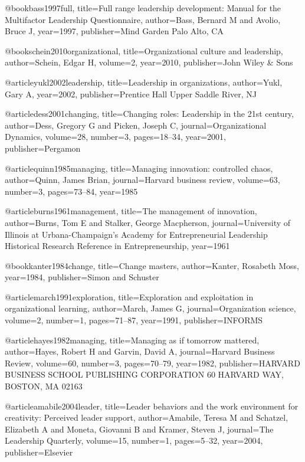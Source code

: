 @book{bass1997full,
  title={Full range leadership development: Manual for the Multifactor Leadership Questionnaire},
  author={Bass, Bernard M and Avolio, Bruce J},
  year={1997},
  publisher={Mind Garden Palo Alto, CA}
}

@book{schein2010organizational,
  title={Organizational culture and leadership},
  author={Schein, Edgar H},
  volume={2},
  year={2010},
  publisher={John Wiley \& Sons}
}

@article{yukl2002leadership,
  title={Leadership in organizations},
  author={Yukl, Gary A},
  year={2002},
  publisher={Prentice Hall Upper Saddle River, NJ}
}

@article{dess2001changing,
  title={Changing roles: Leadership in the 21st century},
  author={Dess, Gregory G and Picken, Joseph C},
  journal={Organizational Dynamics},
  volume={28},
  number={3},
  pages={18--34},
  year={2001},
  publisher={Pergamon}
}

@article{quinn1985managing,
  title={Managing innovation: controlled chaos},
  author={Quinn, James Brian},
  journal={Harvard business review},
  volume={63},
  number={3},
  pages={73--84},
  year={1985}
}

@article{burns1961management,
  title={The management of innovation},
  author={Burns, Tom E and Stalker, George Macpherson},
  journal={University of Illinois at Urbana-Champaign's Academy for Entrepreneurial Leadership Historical Research Reference in Entrepreneurship},
  year={1961}
}

@book{kanter1984change,
  title={Change masters},
  author={Kanter, Rosabeth Moss},
  year={1984},
  publisher={Simon and Schuster}
}

@article{march1991exploration,
  title={Exploration and exploitation in organizational learning},
  author={March, James G},
  journal={Organization science},
  volume={2},
  number={1},
  pages={71--87},
  year={1991},
  publisher={INFORMS}
}


@article{hayes1982managing,
  title={Managing as if tomorrow mattered},
  author={Hayes, Robert H and Garvin, David A},
  journal={Harvard Business Review},
  volume={60},
  number={3},
  pages={70--79},
  year={1982},
  publisher={HARVARD BUSINESS SCHOOL PUBLISHING CORPORATION 60 HARVARD WAY, BOSTON, MA 02163}
}

@article{amabile2004leader,
  title={Leader behaviors and the work environment for creativity: Perceived leader support},
  author={Amabile, Teresa M and Schatzel, Elizabeth A and Moneta, Giovanni B and Kramer, Steven J},
  journal={The Leadership Quarterly},
  volume={15},
  number={1},
  pages={5--32},
  year={2004},
  publisher={Elsevier}
}

